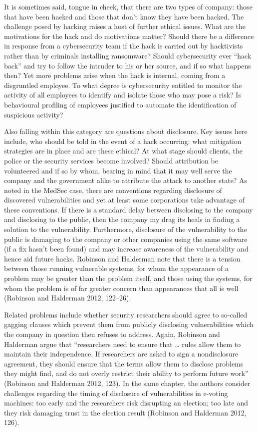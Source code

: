 \documentclass{svjour3}                     %
\begin{document}
It is sometimes said, tongue in cheek, that there are two types of company: those that have been hacked and those that don’t know they have been hacked. The challenge posed by hacking raises a host of further ethical issues. What are the motivations for the hack and do motivations matter? Should there be a difference in response from a cybersecurity team if the hack is carried out by hacktivists rather than by criminals installing ransomware? Should cybersecurity ever “hack back” and try to follow the intruder to his or her source, and if so what happens then? Yet more problems arise when the hack is internal, coming from a disgruntled employee. To what degree is cybersecurity entitled to monitor the activity of all employees to identify and isolate those who may pose a risk? Is behavioural profiling of employees justified to automate the identification of suspicious activity? 

Also falling within this category are questions about disclosure. Key issues here include, who should be told in the event of a hack occurring: what mitigation strategies are in place and are these ethical? At what stage should clients, the police or the security services become involved? Should attribution be volunteered and if so by whom, bearing in mind that it may well serve the company and the government alike to attribute the attack to another state? As noted in the MedSec case, there are conventions regarding disclosure of discovered vulnerabilities and yet at least some corporations take advantage of these conventions. If there is a standard delay between disclosing to the company and disclosing to the public, then the company my drag its heals in finding a solution to the vulnerability. Furthermore, disclosure of the vulnerability to the public is damaging to the company or other companies using the same software (if a fix hasn’t been found) and may increase awareness of the vulnerability and hence aid future hacks. Robinson and Halderman note that there is a tension between those running vulnerable systems, for whom the appearance of a problem may be greater than the problem itself, and those using the systems, for whom the problem is of far greater concern than appearances that all is well (Robinson and Halderman 2012, 122–26).  

Related problems include whether security researchers should agree to so-called gagging clauses which prevent them from publicly disclosing vulnerabilities which the company in question then refuses to address. Again, Robinson and Halderman argue that “researchers need to ensure that … rules allow them to maintain their independence. If researchers are asked to sign a nondisclosure agreement, they should ensure that the terms allow them to disclose problems they might find, and do not overly restrict their ability to perform future work” (Robinson and Halderman 2012, 123). In the same chapter, the authors consider challenges regarding the timing of disclosure of vulnerabilities in e-voting machines: too early and the researchers risk disrupting an election; too late and they risk damaging trust in the election result (Robinson and Halderman 2012, 126).
\end{document}
